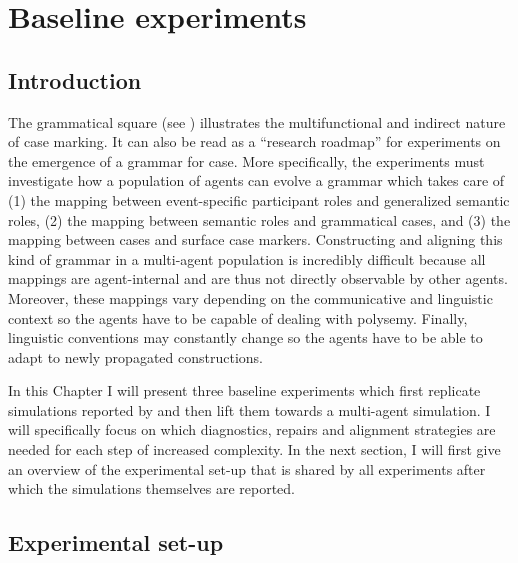 
\setcounter{chapter}{2}
\chapter{Baseline experiments}
\label{c:base}

\section{Introduction}
The grammatical square (see ) illustrates the multifunctional and indirect nature of case marking. It can also be read as a ``research roadmap'' for experiments on the emergence of a grammar for case. More specifically, the experiments must investigate how a population of agents can evolve a grammar which takes care of (1) the mapping between event-specific participant roles and generalized semantic roles, (2) the mapping between semantic roles and grammatical cases, and (3) the mapping between cases and surface case markers. Constructing and aligning this kind of grammar in a multi-agent population is incredibly difficult because all mappings are agent-internal and are thus not directly observable by other agents. Moreover, these mappings vary depending on the communicative and linguistic context so the agents have to be capable of dealing with polysemy. Finally, linguistic conventions may constantly change so the agents have to be able to adapt to newly propagated constructions.

In this Chapter I will present three baseline experiments which first replicate simulations reported by \citet{steels02simulating, steels04constructivist} and then lift them towards a multi-agent simulation. I will specifically focus on which diagnostics, repairs and alignment strategies are needed for each step of increased complexity. In the next section, I will first give an overview of the experimental set-up that is shared by all experiments after which the simulations themselves are reported.

\section{Experimental set-up}

